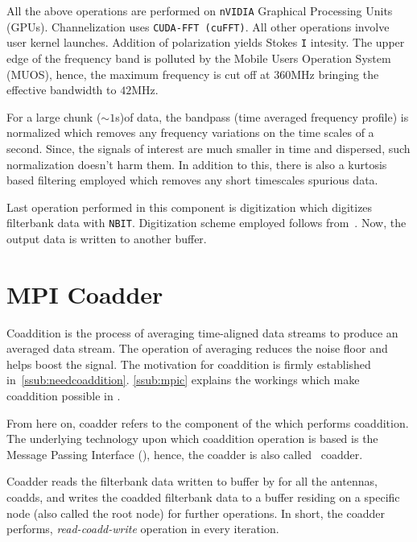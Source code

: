 \par All the above operations are performed on \texttt{nVIDIA} Graphical Processing Units (GPUs). Channelization uses \texttt{CUDA-FFT (cuFFT)}. 
All other operations involve user kernel launches. Addition of polarization yields Stokes \texttt{I} intesity. The upper edge of the \vf frequency band is polluted by the Mobile Users Operation System (MUOS), hence, the maximum frequency is cut off at $360$MHz bringing the effective bandwidth to $42$MHz. 

\par For a large chunk ($\sim 1$s)of data, the bandpass (time averaged frequency profile) is normalized which removes any frequency variations on the time scales of a second. Since, the signals of interest are much smaller in time and dispersed, such normalization doesn't harm them. In addition to this, there is also a kurtosis based filtering employed which removes any short timescales spurious data.

\par Last operation performed in this component is digitization which digitizes filterbank data with \texttt{NBIT}. Digitization scheme employed follows from~\cite{jenetanderson}. Now, the output data is written to another \dada buffer.

\section {MPI Coadder}

\par Coaddition is the process of averaging time-aligned data streams to produce an averaged data stream. The operation of averaging reduces the noise floor and helps boost the signal.
The motivation for coaddition is firmly established in~\autoref{ssub:needcoaddition}. 
\autoref{ssub:mpic} explains the workings which make coaddition possible in \vf. 

\par From here on, coadder refers to the component of the \vf which performs coaddition. The underlying technology upon which coaddition operation is based is the Message Passing Interface (\mpi), hence, the coadder is also called \mpi~coadder.

\par Coadder reads the filterbank data written to \dada buffer by \pb for all the antennas, coadds, and writes the coadded filterbank data to a \dada buffer residing on a specific node (also called the root node) for further operations. 
In short, the coadder performs, \emph{read-coadd-write} operation in every iteration.

